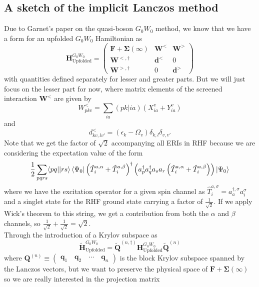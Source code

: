 \subsection{A sketch of the implicit Lanczos method}
Due to Garnet's paper on the quasi-boson $G_0W_0$ method, we know that we have a form for an upfolded $G_0W_0$ Hamiltonian as 
\begin{equation}
    \bm{H}_{\text{Upfolded}}^{G_0W_0} = \begin{pmatrix} \bm{F} +\bm{\Sigma}(\infty) & \bm{W}^< & \bm{W}^> \\ \bm{W}^{<,\dagger} & \bm{d}^< & 0 \\ \bm{W}^{>, \dagger} & 0 & \bm{d}^> \end{pmatrix}
\end{equation}
with quantities defined separately for lesser and greater parts. But we will just focus on the lesser part for now, where matrix elements of the screened interaction $\bm{W}^<$ are given by 
\begin{equation}
    W_{pkv}^{<} = \sum_{ia} (pk|ia) \left( X_{ia}^{v} + Y_{ia}^{v} \right)
\end{equation}
and 
\begin{equation}
    d_{kv,lv'}^{<} = \left(\epsilon_k - \Omega_v\right) \delta_{k,l} \delta_{v,v'}
\end{equation}
Note that we get the factor of $\sqrt{2}$ accompanying all ERIs in RHF because we are considering the expectation value of the form
\begin{equation}
    \frac{1}{2}\sum_{pqrs} \langle pq||rs\rangle \bra{\Psi_0}\left(\hat{T}_i^{a, \alpha} + \hat{T}_i^{a, \beta} \right)^{\dag} \left(a_p^{\dag}a_q^{\dag}a_s a_r \left(\hat{T}_i^{a, \alpha} + \hat{T}_i^{a, \beta} \right)\right)\ket{\Psi_0}
\end{equation}
where we have the excitation operator for a given spin channel as $\hat{T}_i^{a, \sigma} = a_a^{\dag, \sigma} a_i^{\sigma}$ and a singlet state for the RHF ground state carrying a factor of $\frac{1}{\sqrt{2}}$. If we apply Wick's theorem to this string, we get a contribution from both the $\alpha $ and $\beta $ channels, so $\frac{1}{\sqrt{2}} +\frac{1}{\sqrt{2}}= \sqrt{2}$.\\
Through the introduction of a Krylov subspace as 
\begin{equation}
    \bm{\tilde{H}}_{\text{Upfolded}}^{G_0W_0} = \bm{\tilde{Q}}^{(n,\dagger)} \bm{H}_{\text{Upfolded}}^{G_0W_0} \bm{\tilde{Q}}^{(n)}
\end{equation}
where $\bm{Q}^{(n)} \equiv \begin{pmatrix} \bm{q}_1 \quad \bm{q}_2 \quad \cdots \quad \bm{q}_n \end{pmatrix}$ is the block Krylov subspace spanned by the Lanczos vectors, but we want to preserve the physical space of $\bm{F} + \bm{\Sigma}(\infty)$ so we are really interested in the projection matrix
